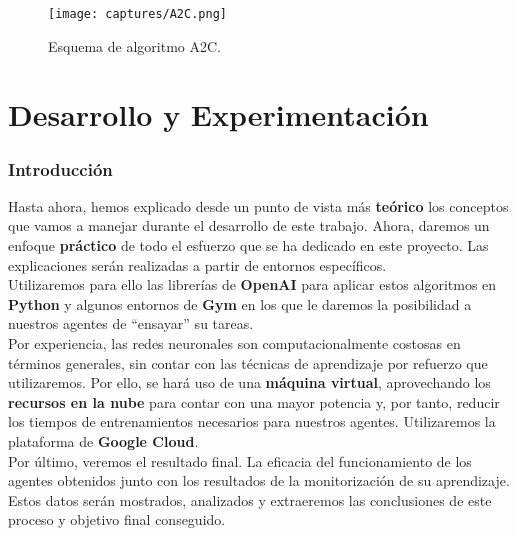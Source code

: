 \documentclass[11pt,fleqn]{book} %
\begin{document}
\begin{figure}[H]
	\centering\texttt{[image: captures/A2C.png]}
	\caption{Esquema de algoritmo A2C.}
	\label{fig:A2C} %
\end{figure}


\part{Desarrollo y Experimentación}

\section*{Introducción}\label{sec:introduccionexp}

Hasta ahora, hemos explicado desde un punto de vista más \textbf{teórico} los conceptos que vamos a manejar durante el desarrollo de este trabajo. Ahora, daremos un enfoque \textbf{práctico} de todo el esfuerzo que se ha dedicado en este proyecto. Las explicaciones serán realizadas a partir de entornos específicos. \\

Utilizaremos para ello las librerías de \textbf{OpenAI} para aplicar estos algoritmos en \textbf{Python} y algunos entornos de \textbf{Gym} en los que le daremos la posibilidad a nuestros agentes de ``ensayar'' su tareas. \\

Por experiencia, las redes neuronales son computacionalmente costosas en términos generales, sin contar con las técnicas de aprendizaje por refuerzo que utilizaremos. Por ello, se hará uso de una \textbf{máquina virtual}, aprovechando los \textbf{recursos en la nube} para contar con una mayor potencia y, por tanto, reducir los tiempos de entrenamientos necesarios para nuestros agentes. Utilizaremos la plataforma de \textbf{Google Cloud}. \\

Por último, veremos el resultado final. La eficacia del funcionamiento de los agentes obtenidos junto con los resultados de la monitorización de su aprendizaje. Estos datos serán mostrados, analizados y extraeremos las conclusiones de este proceso y objetivo final conseguido.
\end{document}
